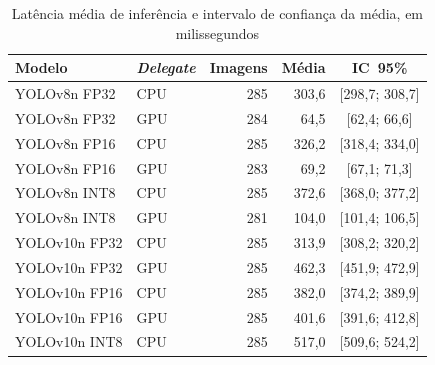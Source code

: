 \begin{table}[htbp]
\centering
\small
\caption{Latência média de inferência e intervalo de confiança da média,
em milissegundos}
\label{tab:intervalos}
\begin{tabular}{llrrc}
\toprule
\textbf{Modelo} & \textbf{\textit{Delegate}} & \textbf{Imagens} &
\textbf{Média} & \textbf{\ac{IC}~95\%} \\
\midrule
YOLOv8n FP32 & \ac{CPU} & 285 & 303,6 & [298,7; 308,7] \\
YOLOv8n FP32 & \ac{GPU} & 284 & 64,5 & [62,4; 66,6] \\
YOLOv8n FP16 & \ac{CPU} & 285 & 326,2 & [318,4; 334,0] \\
YOLOv8n FP16 & \ac{GPU} & 283 & 69,2 & [67,1; 71,3] \\
YOLOv8n INT8 & \ac{CPU} & 285 & 372,6 & [368,0; 377,2] \\
YOLOv8n INT8 & \ac{GPU} & 281 & 104,0 & [101,4; 106,5] \\
\midrule
YOLOv10n FP32 & \ac{CPU} & 285 & 313,9 & [308,2; 320,2] \\
YOLOv10n FP32 & \ac{GPU} & 285 & 462,3 & [451,9; 472,9] \\
YOLOv10n FP16 & \ac{CPU} & 285 & 382,0 & [374,2; 389,9] \\
YOLOv10n FP16 & \ac{GPU} & 285 & 401,6 & [391,6; 412,8] \\
YOLOv10n INT8 & \ac{CPU} & 285 & 517,0 & [509,6; 524,2] \\
\bottomrule
\end{tabular}
\end{table}

